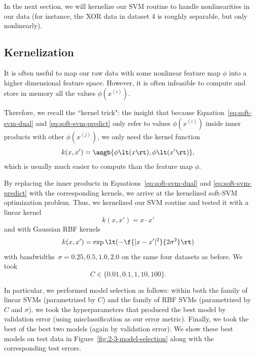 \documentclass{article}
\newcommand{\sind}[1]{^{(#1)}}
\begin{document}
\begin{multicols}{2}
In the next section, we will kernelize our SVM routine
to handle nonlinearities in our data
(for instance, the XOR data in dataset 4 is roughly separable, but only nonlinearly).



\subsection{Kernelization}
\label{subsec:kernelization}

It is often useful to map our raw data
with some nonlinear feature map $\phi$
into a higher dimensional feature space.
However, it is often infeasible to compute and store in memory
all the values $\phi(x\sind{i})$.

Therefore, we recall the ``kernel trick": the insight that
because Equation~\ref{eq:soft-svm-dual} and \ref{eq:soft-svm-predict}
only refer to values $\phi(x\sind{i})$ inside inner products
with other $\phi(x\sind{j})$,
we only need the kernel function
\begin{equation}
    k(x, x') = \angb{\phi\lt(x\rt), \phi\lt(x'\rt)},
\end{equation}
which is usually much easier to compute than the feature map $\phi$.

By replacing the inner products in
Equations~\ref{eq:soft-svm-dual} and \ref{eq:soft-svm-predict}
with the corresponding kernels,
we arrive at the kernelized soft-SVM optimization problem.
Thus, we kernelized our SVM routine
and tested it with a linear kernel
\begin{equation}
    k(x, x') = x\cdot x'
\end{equation}
and with Gaussian RBF kernels
\begin{equation}
    k(x, x') = \exp\lt(-\f{|x - x'|^2}{2\sigma^2}\rt)
\end{equation}
with bandwidths~$\sigma=0.25,0.5,1.0,2.0$ on the same four datasets as before.
We took
\[
    C \in \{0.01, 0.1, 1, 10, 100\}.
\]

In particular, we performed model selection as follows:
within both the family of linear SVMs (parametrized by $C$)
and the family of RBF SVMs (parametrized by $C$ and $\sigma$).
we took the hyperparameters that produced the best model by validation error
(using misclassification as our error metric).
Finally, we took the best of the best two models (again by validation error).
We show these best models on test data in Figure~\ref{fig:2-3-model-selection}
along with the corresponding test errors.


\end{multicols}
\end{document}
